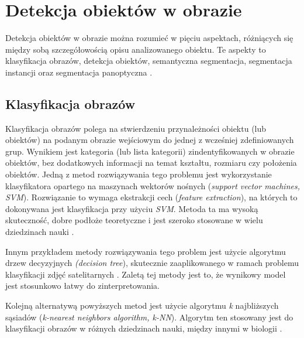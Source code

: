 \section{Detekcja obiektów w obrazie}
\label{sec:typy_detekcji}

Detekcja obiektów w obrazie można rozumieć w pięciu aspektach, różniących się między sobą szczegółowością opisu analizowanego obiektu. Te aspekty to klasyfikacja obrazów, detekcja obiektów, semantyczna segmentacja, segmentacja instancji \cite{survey-of-object-classification} oraz segmentacja panoptyczna \cite{panoptic-segmentation}.

\subsection*{Klasyfikacja obrazów}
Klasyfikacja obrazów polega na stwierdzeniu przynależności obiektu (lub obiektów) na podanym obrazie wejściowym do jednej z wcześniej zdefiniowanych grup. Wynikiem jest kategoria (lub lista kategorii) zindentyfikowanych w obrazie obiektów, bez dodatkowych informacji na temat kształtu, rozmiaru czy położenia obiektów. Jedną z metod rozwiązywania tego problemu jest wykorzystanie klasyfikatora opartego na maszynach wektorów nośnych (\textit{support vector machines, SVM}). Rozwiązanie to wymaga ekstrakcji cech (\textit{feature extraction}), na których to dokonywana jest klasyfikacja przy użyciu \textit{SVM}. Metoda ta ma wysoką skuteczność, dobre podłoże teoretyczne i jest szeroko stosowane w wielu dziedzinach nauki \cite{analysis-image-classification}.

Innym przykładem metody rozwiązywania tego problem jest użycie algorytmu drzew decyzyjnych \textit{(decision tree}), skutecznie zaaplikowanego w ramach problemu klasyfikacji zdjęć satelitarnych \cite{decision-image-classifier}. Zaletą tej metody jest to, że wynikowy model jest stosunkowo łatwy do zinterpretowania.

Kolejną alternatywą powyższych metod jest użycie algorytmu \textit{k} najbliższych sąsiadów (\textit{k-nearest neighbors algorithm, k-NN}). Algorytm ten stosowany jest do klasyfikacji obrazów w różnych dziedzinach nauki, między innymi w biologii \cite{analysis-image-classification}.

